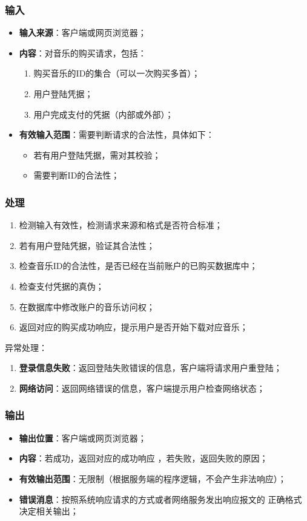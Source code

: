 \subsubsection{输入}
	\begin{itemize}
		\item \textbf{输入来源}：客户端或网页浏览器；
		\item \textbf{内容}：对音乐的购买请求，包括：
		\begin{enumerate}
			\item 购买音乐的ID的集合（可以一次购买多首）；
			\item 用户登陆凭据；
			\item 用户完成支付的凭据（内部或外部）；
		\end{enumerate}
		\item \textbf{有效输入范围}：需要判断请求的合法性，具体如下：
		\begin{itemize}
			\item 若有用户登陆凭据，需对其校验； 
			\item 需要判断ID的合法性；
		\end{itemize}
	\end{itemize}
\subsubsection{处理}
	\begin{enumerate}
		\item 检测输入有效性，检测请求来源和格式是否符合标准；
		\item 若有用户登陆凭据，验证其合法性；
		\item 检查音乐ID的合法性，是否已经在当前账户的已购买数据库中；
		\item 检查支付凭据的真伪；
		\item 在数据库中修改账户的音乐访问权；
		\item 返回对应的购买成功响应，提示用户是否开始下载对应音乐；
	\end{enumerate}
	\noindent 异常处理：
	\begin{enumerate}
		\item \textbf{登录信息失败}：返回登陆失败错误的信息，客户端将请求用户重登陆；
		\item \textbf{网络访问}：返回网络错误的信息，客户端提示用户检查网络状态；
	\end{enumerate}
\subsubsection{输出}
\begin{itemize}
	\item \textbf{输出位置}：客户端或网页浏览器；
	\item \textbf{内容}：若成功，返回对应的成功响应 ，若失败，返回失败的原因；
	\item \textbf{有效输出范围}：无限制（根据服务端的程序逻辑，不会产生非法响应）；
	\item \textbf{错误消息}：按照系统响应请求的方式或者网络服务发出响应报文的
		正确格式决定相关输出；
\end{itemize}

